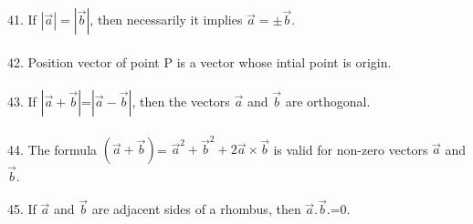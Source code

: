 \documentclass{article}
\begin{document}
\\
\\
41. If $|\overrightarrow{a}|=|\overrightarrow{b}|$, then necessarily it implies $\overrightarrow{a}=\pm\overrightarrow{b}.$
\\
\\
42. Position vector of point P is a vector whose intial point is origin.
\\
\\
43. If $|\overrightarrow{a}+\overrightarrow{b}|$=$|\overrightarrow{a}-\overrightarrow{b}|$, then the vectors $\overrightarrow{a}$ and $\overrightarrow{b}$ are orthogonal.
\\
\\
44. The formula $(\overrightarrow{a}+\overrightarrow{b})$= $\overrightarrow{a}^2+\overrightarrow{b}^2+2\overrightarrow{a}\times\overrightarrow{b}$ is valid for non-zero vectors $\overrightarrow{a}$ and $\overrightarrow{b}.$
\\
\\
45. If $\overrightarrow{a}$ and $\overrightarrow{b}$ are adjacent sides of a rhombus, then $\overrightarrow{a}.\overrightarrow{b}.$=0.
\\
\\
\end{document}
